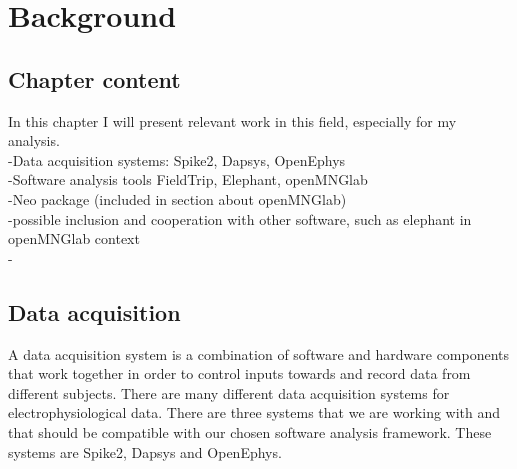 \chapter{Background}
\section{Chapter content}
In this chapter I will present relevant work in this field, especially for my analysis.\\
-Data acquisition systems: Spike2, Dapsys, OpenEphys\\
-Software analysis tools FieldTrip, Elephant, openMNGlab\\
-Neo package (included in section about openMNGlab)\\
-possible inclusion and cooperation with other software, such as elephant in openMNGlab context\\


-%



\section{Data acquisition} 
A data acquisition system is a combination of software and hardware components that work together in order to control inputs towards and record data from different subjects.
There are many different data acquisition systems for electrophysiological data. There are three systems that we are working with and that should be compatible with our chosen software analysis framework. These systems are Spike2, Dapsys and OpenEphys.


